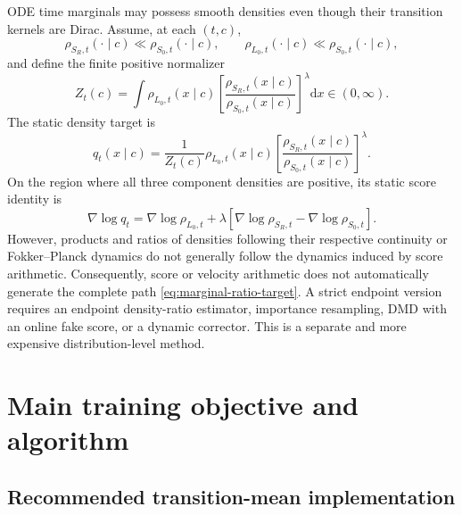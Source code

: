 \documentclass[11pt,a4paper]{article}
\newcommand{\dd}{\mathrm{d}}
\newcommand{\Sbase}{S_0}
\newcommand{\Srl}{S_R}
\newcommand{\Lbase}{L_0}
\theoremstyle{plain}
\theoremstyle{definition}
\begin{document}
ODE time marginals may possess smooth densities even though their transition kernels are Dirac.
Assume, at each $(t,c)$,
\begin{equation}
\rho_{\Srl,t}(\cdot\mid c)\ll\rho_{\Sbase,t}(\cdot\mid c),
\qquad
\rho_{\Lbase,t}(\cdot\mid c)\ll\rho_{\Sbase,t}(\cdot\mid c),
\label{eq:marginal-support}
\end{equation}
and define the finite positive normalizer
\begin{equation}
Z_t(c)
=
\int
\rho_{\Lbase,t}(x\mid c)
\left[
\frac{\rho_{\Srl,t}(x\mid c)}
     {\rho_{\Sbase,t}(x\mid c)}
\right]^\lambda
\dd x
\in(0,\infty).
\label{eq:marginal-normalizer}
\end{equation}
The static density target is
\begin{equation}
q_t(x\mid c)
=
\frac1{Z_t(c)}
\rho_{\Lbase,t}(x\mid c)
\left[
\frac{\rho_{\Srl,t}(x\mid c)}
     {\rho_{\Sbase,t}(x\mid c)}
\right]^\lambda.
\label{eq:marginal-ratio-target}
\end{equation}
On the region where all three component densities are positive, its static score identity is
\begin{equation}
\nabla\log q_t
=
\nabla\log\rho_{\Lbase,t}
+\lambda
\left[
\nabla\log\rho_{\Srl,t}
-\nabla\log\rho_{\Sbase,t}
\right].
\label{eq:marginal-score-arithmetic}
\end{equation}
However, products and ratios of densities following their respective continuity or
Fokker--Planck dynamics do not generally follow the dynamics induced by score arithmetic.
Consequently, score or velocity arithmetic does not automatically generate
the complete path \eqref{eq:marginal-ratio-target}.  A strict endpoint version requires an
endpoint density-ratio estimator, importance resampling, DMD with an online fake score, or a
dynamic corrector.  This is a separate and more expensive distribution-level method.

\section{Main training objective and algorithm}
\label{sec:algorithm}

\subsection{Recommended transition-mean implementation}
\end{document}
